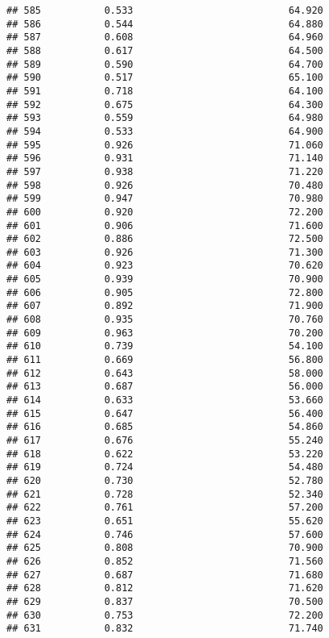 \documentclass[
]{article}
\begin{document}
\begin{verbatim}
## 585           0.533                           64.920
## 586           0.544                           64.880
## 587           0.608                           64.960
## 588           0.617                           64.500
## 589           0.590                           64.700
## 590           0.517                           65.100
## 591           0.718                           64.100
## 592           0.675                           64.300
## 593           0.559                           64.980
## 594           0.533                           64.900
## 595           0.926                           71.060
## 596           0.931                           71.140
## 597           0.938                           71.220
## 598           0.926                           70.480
## 599           0.947                           70.980
## 600           0.920                           72.200
## 601           0.906                           71.600
## 602           0.886                           72.500
## 603           0.926                           71.300
## 604           0.923                           70.620
## 605           0.939                           70.900
## 606           0.905                           72.800
## 607           0.892                           71.900
## 608           0.935                           70.760
## 609           0.963                           70.200
## 610           0.739                           54.100
## 611           0.669                           56.800
## 612           0.643                           58.000
## 613           0.687                           56.000
## 614           0.633                           53.660
## 615           0.647                           56.400
## 616           0.685                           54.860
## 617           0.676                           55.240
## 618           0.622                           53.220
## 619           0.724                           54.480
## 620           0.730                           52.780
## 621           0.728                           52.340
## 622           0.761                           57.200
## 623           0.651                           55.620
## 624           0.746                           57.600
## 625           0.808                           70.900
## 626           0.852                           71.560
## 627           0.687                           71.680
## 628           0.812                           71.620
## 629           0.837                           70.500
## 630           0.753                           72.200
## 631           0.832                           71.740

\end{verbatim}
\end{document}
